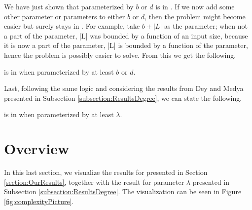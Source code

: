 We have just shown that \HL parameterized by $b$ or $d$ is in \XP.
If we now add some other parameter or parameters to either $b$ or $d$, then the problem
might become easier but surely stays in \XP.
For example, take $b+|L|$ as the parameter;
when not a part of the parameter, |L| was bounded by a function of an input size,
because it is now a part of the parameter, |L| is bounded by a function of the parameter,
hence the problem is possibly easier to solve.
From this we get the following.

\begin{corollary}\label{cor:BD:variation:XP}
    \HL is in \XP when parameterized by at least $b$ or $d$.
\end{corollary}

Last, following the same logic and considering the results from Dey and Medya \cite{Dey2019} presented in Subsection \ref{subsection:ResultsDegree},
we can state the following.

\begin{corollary}\label{cor:Ld:variation:FPT}
    \HL is in \XP when parameterized by at least $\lambda$.
\end{corollary}

\section{Overview}

In this last section, we visualize the results for \HLdeg presented in Section \ref{section:OurResults},
together with the result for parameter $\lambda$ presented in Subsection \ref{subsection:ResultsDegree}.
The visualization can be seen in Figure \ref{fig:complexityPicture}.

